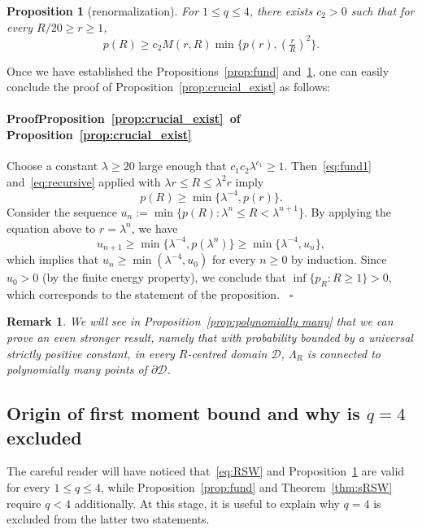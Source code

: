 \documentclass[a4paper,oneside,11pt]{article}
\newtheorem{proposition}[theorem]{Proposition}
\newtheorem{remark}[theorem]{Remark}
\numberwithin{equation}{section}
\numberwithin{equation}{section}
\numberwithin{equation}{section}
\newenvironment{proof}[1][\relax]%
  {\paragraph{Proof\ifx#1\relax\else~of #1\fi}}%
  {~\hfill$\square$\par\bigskip}
\newcommand{\calD}{\mathcal{D}}
\begin{document}
\begin{proposition}[renormalization]\label{prop:renormalization}
For $1\le q\le 4$, there exists $c_2>0$ such that for every $R/20\ge r\ge 1$,
\begin{equation}\label{eq:recursive}
p(R)\ge c_2M(r,R)\min\{p(r),(\tfrac rR)^2\}.
\end{equation}
\end{proposition}


Once we have established the Propositions~\ref{prop:fund} and~\ref{prop:renormalization}, one can easily conclude the proof of Proposition~\ref{prop:crucial_exist} as follows: 

\begin{proof}[Proposition~\ref{prop:crucial_exist}] 
	Choose a constant $\lambda \geq 20$ large enough that $c_1c_2\lambda^{c_1}\geq 1$. 
	Then~\eqref{eq:fund1} and~\eqref{eq:recursive} applied with $\lambda r\le R \le \lambda^2 r$ imply  
	$$p(R) \geq \min\{\lambda^{-4}, p(r)\}.$$
	Consider the sequence $u_n:=\min\{p(R):\lambda^n\le R< \lambda^{n+1}\}$. 
	By applying the equation above to $r=\lambda^n$, we have  
	$$u_{n+1} \geq \min\{\lambda^{-4}, p(\lambda^n)\}\ge \min\{\lambda^{-4}, u_n\},$$ 
	which implies  that $u_n\geq  \min(\lambda^{-4},u_0)$ for every $n\ge 0$ by induction. 
Since $u_0>0$ (by the finite energy property), we conclude that $\inf \{p_R: R\geq 1\} > 0,$ which corresponds to the statement of the proposition. 
 \end{proof}

\begin{remark}
We will see in Proposition~\ref{prop:polynomially many} that we can prove an even stronger result, namely that with probability bounded by a universal strictly positive constant, in every $R$-centred domain $\calD$, $\Lambda_R$ is connected to polynomially many points of $\partial\calD$.
\end{remark}


\subsection{Origin of first moment bound and why is $q=4$ excluded}\label{sec:q=4}

The careful reader will have noticed that~\eqref{eq:RSW} and Proposition~\ref{prop:renormalization} are valid for every $1\le q\le 4$, while Proposition~\ref{prop:fund} and Theorem~\ref{thm:sRSW} require $q<4$ additionally. 
At this stage, it is useful to explain why $q=4$ is excluded from the latter two statements. 
\end{document}
